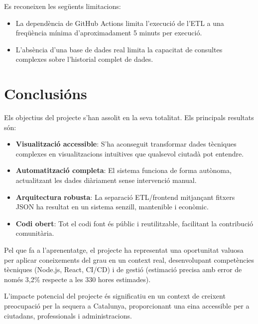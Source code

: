 \documentclass[11pt, a4paper]{article}
\begin{document}
Es reconeixen les següents limitacions:
\begin{itemize}[leftmargin=*]
    \item La dependència de GitHub Actions limita l'execució de l'ETL a una freqüència mínima d'aproximadament 5 minuts per execució.
    \item L'absència d'una base de dades real limita la capacitat de consultes complexes sobre l'historial complet de dades.
\end{itemize}


\section{Conclusións}

Els objectius del projecte s'han assolit en la seva totalitat. Els principals resultats són:

\begin{itemize}[leftmargin=*]
    \item \textbf{Visualització accessible}: S'ha aconseguit transformar dades tècniques complexes en visualitzacions intuïtives que qualsevol ciutadà pot entendre.
    \item \textbf{Automatització completa}: El sistema funciona de forma autònoma, actualitzant les dades diàriament sense intervenció manual.
    \item \textbf{Arquitectura robusta}: La separació ETL/frontend mitjançant fitxers JSON ha resultat en un sistema senzill, mantenible i econòmic.
    \item \textbf{Codi obert}: Tot el codi font és públic i reutilitzable, facilitant la contribució comunitària.
\end{itemize}

Pel que fa a l'aprenentatge, el projecte ha representat una oportunitat valuosa per aplicar coneixements del grau en un context real, desenvolupant competències tècniques (Node.js, React, CI/CD) i de gestió (estimació precisa amb error de només 3,2\% respecte a les 330 hores estimades).

L'impacte potencial del projecte és significatiu en un context de creixent preocupació per la sequera a Catalunya, proporcionant una eina accessible per a ciutadans, professionals i administracions.

\end{document}
